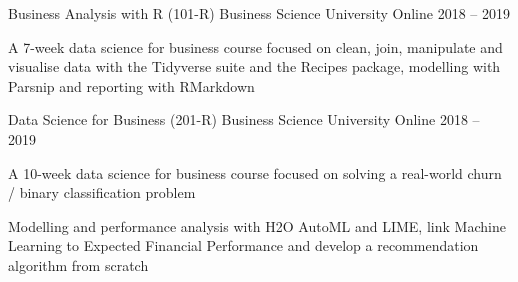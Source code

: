 

\begin{cventries}

  \cventry
    {Business Analysis with R (101-R)} %
    {Business Science University} %
    {Online} %
    {2018 – 2019} %
    {
      \begin{cvitems} %
        \item {A 7-week data science for business course focused on clean, join, manipulate and visualise data with the Tidyverse suite and the Recipes package, modelling with Parsnip and reporting with RMarkdown}
      \end{cvitems}
    }

  \cventry
    {Data Science for Business (201-R)} %
    {Business Science University} %
    {Online} %
    {2018 – 2019} %
    {
      \begin{cvitems} %
        \item {A 10-week data science for business course focused on solving a real-world churn / binary classification problem}
        \item {Modelling and performance analysis with H2O AutoML and LIME, link Machine Learning to Expected Financial Performance and develop a recommendation algorithm from scratch}
      \end{cvitems}
    }
    

\end{cventries}
